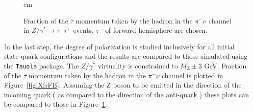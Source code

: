 \documentclass[12pt]{article}
\def\Ztautau{\ensuremath{Z/\gamma^{*}\to\tau^{-}\tau^{+}}\xspace}
\def\Tau{\ensuremath{\tau}\xspace}
\def\TauMin{\ensuremath{\tau^-}\xspace}
\def\PI{\ensuremath{\pi^{-}\nu}\xspace}
\def\ZGAMMA{\ensuremath{Z/\gamma^{*}}\xspace}
\begin{document}
\begin{figure}
\centering 
{}
 cm
\caption{
Fraction of the \Tau momentum
  taken by the hadron in the \PI channel in
  \Ztautau events.
\TauMin of forward hemisphere are chosen.
}
\label{fig:XfrICC}
\end{figure}


In the last step, the degree of polarization is
studied inclusively for all initial state quark configurations and the results are compared to
those simulated using the {\tt Tauola} package. The \ZGAMMA virtuality is constrained to $M_\mathrm{Z}\pm$3 GeV.
Fraction of the \Tau momentum taken by the hadron in the \PI
channel is plotted in Figure~\ref{fig:XfrFB}. Assuming the Z boson to 
be emitted in the direction of the incoming quark ( as compared to the
direction of the anti-quark ) these plots can be compared to those in Figure~\ref{fig:XfrICC}.
\end{document}
